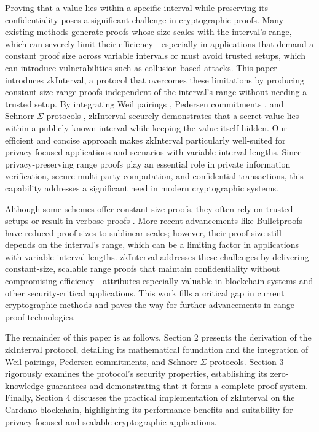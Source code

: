 \documentclass[version=preprint]{iacrcc}
\begin{document}
Proving that a value lies within a specific interval while preserving its confidentiality poses a significant challenge in cryptographic proofs. Many existing methods generate proofs whose size scales with the interval's range, which can severely limit their efficiency—especially in applications that demand a constant proof size across variable intervals or must avoid trusted setups, which can introduce vulnerabilities such as collusion-based attacks. This paper introduces zkInterval, a protocol that overcomes these limitations by producing constant-size range proofs independent of the interval's range without needing a trusted setup. By integrating Weil pairings \cite{menezes93}, Pedersen commitments \cite{pc92}, and Schnorr $\Sigma$-protocols \cite{zero20}, zkInterval securely demonstrates that a secret value lies within a publicly known interval while keeping the value itself hidden. Our efficient and concise approach makes zkInterval particularly well-suited for privacy-focused applications and scenarios with variable interval lengths. Since privacy-preserving range proofs play an essential role in private information verification, secure multi-party computation, and confidential transactions, this capability addresses a significant need in modern cryptographic systems.

Although some schemes offer constant-size proofs, they often rely on trusted setups \cite{} or result in verbose proofs \cite{}. More recent advancements like Bulletproofs \cite{bbb18} have reduced proof sizes to sublinear scales; however, their proof size still depends on the interval's range, which can be a limiting factor in applications with variable interval lengths. zkInterval addresses these challenges by delivering constant-size, scalable range proofs that maintain confidentiality without compromising efficiency—attributes especially valuable in blockchain systems and other security-critical applications. This work fills a critical gap in current cryptographic methods and paves the way for further advancements in range-proof technologies.

The remainder of this paper is as follows. Section 2 presents the derivation of the zkInterval protocol, detailing its mathematical foundation and the integration of Weil pairings, Pedersen commitments, and Schnorr $\Sigma$-protocols. Section 3 rigorously examines the protocol's security properties, establishing its zero-knowledge guarantees and demonstrating that it forms a complete proof system. Finally, Section 4 discusses the practical implementation of zkInterval on the Cardano blockchain, highlighting its performance benefits and suitability for privacy-focused and scalable cryptographic applications.
\end{document}
